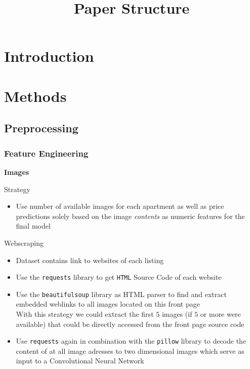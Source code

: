 \documentclass[12pt, letterpaper]{article}
\title{Paper Structure}
\author{}
\date{}
\begin{document}
\maketitle
\tableofcontents
\setcounter{tocdepth}{3}

\section{Introduction}

\section{Methods}

\subsection{Preprocessing}

\subsubsection{Feature Engineering}

\textbf{Images}

Strategy
\begin{itemize}
    \item Use number of available images for each apartment as well as price predictions solely based on the image \emph{contents} as numeric features for the final model
\end{itemize}

Webscraping
\begin{itemize}
    \item Dataset contains link to websites of each listing
    \item Use the \texttt{requests} library to get \texttt{HTML} Source Code of each website
    \item Use the \texttt{beautifulsoup} library as HTML parser to find and extract embedded weblinks to all images located on this front page \\
          With this strategy we could extract the first $5$ images (if $5$ or more were available) that could be directly accessed from the front page source code
    \item Use \texttt{requests} again in combination with the \texttt{pillow} library to decode the content of at all image adresses to two dimensional images which serve as input to a Convolutional Neural Network
\end{itemize}
\end{document}
